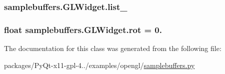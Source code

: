 \subsubsection[{list\+\_\+}]{\setlength{\rightskip}{0pt plus 5cm}samplebuffers.\+G\+L\+Widget.\+list\+\_\+}\label{classsamplebuffers_1_1GLWidget_a722af7356009ccc61b5a4f79ea8a46a4}
\hypertarget{classsamplebuffers_1_1GLWidget_a378dc7fec305e47a7ba2a0b6a74a9a50}{}
\subsubsection[{rot}]{\setlength{\rightskip}{0pt plus 5cm}float samplebuffers.\+G\+L\+Widget.\+rot = 0.\hspace{0.3cm}{\ttfamily [static]}}\label{classsamplebuffers_1_1GLWidget_a378dc7fec305e47a7ba2a0b6a74a9a50}


The documentation for this class was generated from the following file\+:\begin{DoxyCompactItemize}
\item 
packages/\+Py\+Qt-\/x11-\/gpl-\/4../examples/opengl/\hyperlink{samplebuffers_8py}{samplebuffers.\+py}\end{DoxyCompactItemize}
